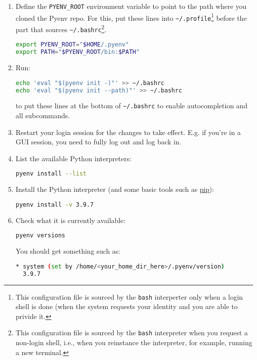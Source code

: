 \begin{enumerate}
\begin{enumerate}
\begin{enumerate}
\item Define the \verb|PYENV_ROOT| environment variable to point to
  the path where you cloned the Pyenv repo. For this, put these lines
  into \verb|~/.profile|\footnote{This configuration file is sourced
    by the \texttt{bash} interperter only when a login shell is done
    (when the system requests your identity and you are able to
    privide it.} before the part that sources
  \verb|~/.bashrc|\footnote{This configuration file is sourced by the
    \texttt{bash} interpreter when you request a non-login shell, i.e.,
    when you reinstance the interpreter, for example, running a new
    terminal.}.
        
  \begin{lstlisting}[mathescape=false, language=Bash]
export PYENV_ROOT="$HOME/.pyenv"
export PATH="$PYENV_ROOT/bin:$PATH"
\end{lstlisting}

\item Run:
  \begin{lstlisting}[mathescape=false, language=Bash]
echo 'eval "$(pyenv init -)"' >> ~/.bashrc
echo 'eval "$(pyenv init --path)"' >> ~/.bashrc
\end{lstlisting}
to put these lines at the bottom of \verb|~/.bashrc| to enable
autocompletion and all subcommands.

\item Restart your login session for the changes to take
  effect. E.g. if you're in a GUI session, you need to fully log out
  and log back in.

\item List the available Python interpreters:
  \begin{lstlisting}[mathescape=false, language=Bash]
pyenv install --list
\end{lstlisting}

\item Install the Python interpreter (and some basic tools such as \href{https://pypi.org/project/pip/}{pip}):
  \begin{lstlisting}[mathescape=false, language=Bash]
pyenv install -v 3.9.7
\end{lstlisting}

\item Check what it is currently available:
  \begin{lstlisting}[mathescape=false, language=Bash]
pyenv versions        
\end{lstlisting}
You should get something such as:
\begin{lstlisting}[mathescape=false, language=Bash]
* system (set by /home/<your_home_dir_here>/.pyenv/version)
  3.9.7
\end{lstlisting}


\end{enumerate}
\end{enumerate}
\end{enumerate}
